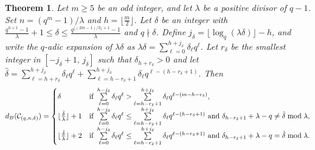 \documentclass[journal,onecolumn]{IEEEtran}
\newtheorem{theorem}{Theorem}
\begin{document}
\begin{theorem}\label{bosth}
Let  $m\geq 5$ be an  odd integer, and let $\lambda$ be a positive divisor of $q-1$.  Set $n=(q^m-1)/\lambda$ and $h=\lfloor\frac{m}{2}\rfloor$. Let    $\delta$  be an integer with    $\frac{q^{h+1}-1}{\lambda}+1 \leq \delta \leq \frac{q^{\lfloor (2m-1)/3\rfloor+1}-1}{\lambda}$ and  $q\nmid \delta$. Define $j_{\delta} = \lfloor \log_q (\lambda \delta) \rfloor - h$, and  
write the $q$-adic expansion of $\lambda \delta$ as
$\lambda \delta=\sum\limits_{\ell=0}^{h + j_{\delta}} \delta_{\ell} q^{\ell}$. Let $r_{\delta}$ be   the smallest integer in $[-j_{\delta} + 1,\, j_{\delta}]$ such that $\delta_{h + r_{\delta}} > 0$
and let 
$
\hat{\delta} = \sum\limits_{\ell = h + r_{\delta}}^{h + j_{\delta}} \delta_{\ell} q^{\ell} + \sum\limits_{\ell =h - r_{\delta}+1}^{h + j_{\delta}} \delta_{\ell} q^{\ell - (h - r_{\delta}+1)}.
$
Then 
\begin{equation}\label{bose1}
d_B(\mathcal{C}_{(q,n,\delta)}) = \begin{cases}
\delta &\hbox{if }\sum\limits_{\ell=0}^{h-j_{\delta}} \delta_{\ell} q^{\ell} > \sum\limits_{\ell= h - r_{\delta}+1}^{h + j_{\delta}} \delta_{\ell} q^{\ell - (m - h - r_{\delta})}, \\
\lfloor \frac{\hat{\delta} }{\lambda}\rfloor+1 &\hbox{if } \sum\limits_{\ell=0}^{h-j_{\delta}} \delta_{\ell} q^{\ell} \leq \sum\limits_{\ell=h - r_{\delta}+1}^{h + j_{\delta}} \delta_{\ell} q^{\ell - (h - r_{\delta} + 1)} \hbox{ and  } \delta_{h - r_{\delta}+1}+\lambda -q  \neq \hat{\delta} \bmod \lambda, \\
\lfloor \frac{\hat{\delta} }{\lambda}\rfloor+ 2 &\hbox{if } \sum\limits_{\ell=0}^{h-j_{\delta}} \delta_{\ell} q^{\ell} \leq \sum\limits_{\ell=h - r_{\delta}+1}^{h + j_{\delta}} \delta_{\ell} q^{\ell - (h - r_{\delta} + 1)} \hbox{ and  } 
\delta_{h - r_{\delta}+1}+\lambda -q= \hat{\delta} \bmod \lambda.
\end{cases}
\end{equation}
\end{theorem}
\end{document}
